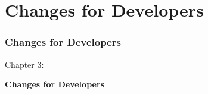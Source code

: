 %

\section{Changes for Developers}
\begin{frame}[fragile]
	\frametitle{Changes for Developers}

	\begin{center}\huge{Chapter 3:}\end{center}
	\begin{center}\huge{\color{typo3darkgrey}\textbf{Changes for Developers}}\end{center}

\end{frame}

